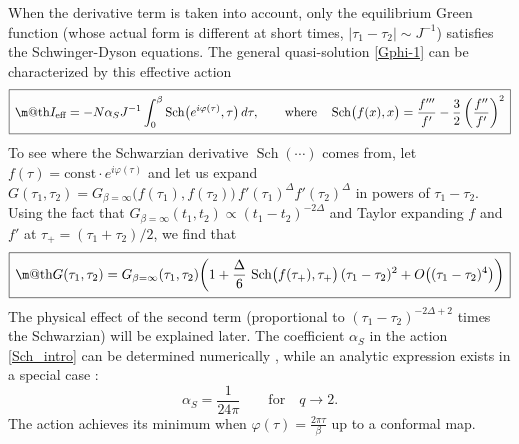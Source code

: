 \documentclass[12pt]{article}
\makeatletter
\newcommand*{\wideboxed}[1]{\setlength{\fboxsep}{1ex}%
  \fbox{\m@th$\displaystyle#1$}}
\newcommand{\const}{\mathrm{const}}
\DeclareMathOperator{\Sch}{Sch}
\newcommand{\eff}{\text{eff}}
\newcommand{\vp}{\varphi}
\makeatother
\begin{document}
When the derivative term is taken into account, only the equilibrium Green function (whose actual form is different at short times, $|\tau_1-\tau_2|\sim J^{-1}$) satisfies the Schwinger-Dyson equations. The general quasi-solution \eqref{Gphi-1} can be characterized by this effective action \cite{Kit.KITP, MS16}
\begin{equation}\label{Sch_intro}
\wideboxed{
I_{\eff}=-N\alpha_S J^{-1}
\int_{0}^{\beta}\Sch\bigl(e^{i\vp(\tau)},\tau\bigr)\,d\tau,\qquad
\text{where}\quad
\Sch\bigl(f(x),x\bigr)
=\frac{f'''}{f'}-\frac{3}{2}\left(\frac{f''}{f'}\right)^2
}
\end{equation}
To see where the Schwarzian derivative $\Sch(\cdots)$ comes from, let $f(\tau)=\const\cdot e^{i\vp(\tau)}$ and let us expand $G(\tau_1,\tau_2) =G_{\beta=\infty}\bigl(f(\tau_1),f(\tau_2)\bigr)\, f'(\tau_1)^{\Delta}f'(\tau_2)^{\Delta}$ in powers of $\tau_1-\tau_2$. Using the fact that $G_{\beta=\infty}(t_1,t_2)\propto (t_1-t_2)^{-2\Delta}$ and Taylor expanding $f$ and $f'$ at $\tau_+=(\tau_1+\tau_2)/2$, we find that
\begin{equation}\label{Grepar_intro}
\wideboxed{
G(\tau_1,\tau_2) =
G_{\beta=\infty}(\tau_1,\tau_2)\biggl(1+\frac{\Delta}{6}\,
\Sch\bigl(f(\tau_+),\tau_+\bigr)\,(\tau_1-\tau_2)^2
+O\bigl((\tau_1-\tau_2)^4\bigr)\biggr)
}
\end{equation}
The physical effect of the second term (proportional to $(\tau_1-\tau_2)^{-2\Delta+2}$ times the Schwarzian) will be explained later. The coefficient $\alpha_S$ in the action \eqref{Sch_intro} can be determined numerically \cite{MS16}, while an analytic expression exists in a special case \cite{MS16,JeSuYo16}:
\begin{equation}
\alpha_S=\frac{1}{24\pi}\qquad \text{for}\quad q\to 2.
\end{equation}
The action achieves its minimum when $\vp(\tau)=\frac{2\pi\tau}{\beta}$ up to a conformal map.
\end{document}
